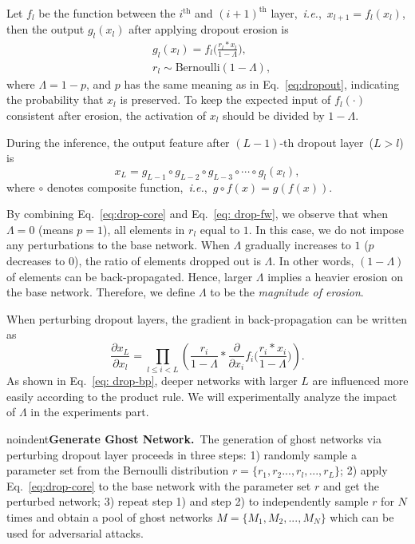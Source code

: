 \documentclass[letterpaper]{article} %
\def\ie{\emph{i.e.}}
\begin{document}
Let $f_l$ be the function between the $i^\text{th}$ and $(i+1)^\text{th}$ layer,~\ie,~$x_{l+1}=f_l(x_l)$, then the output $g_l(x_l)$ after applying dropout erosion is
\begin{equation} \label{eq:drop-core}
\begin{split}
& g_l(x_l) = f_l\Big(\frac{r_l*x_l}{1-\Lambda}\Big), \\
& r_l\sim\text{Bernoulli}(1-\Lambda),
\end{split}
\end{equation}
where $\Lambda=1-p$, and $p$ has the same meaning as in Eq.~\eqref{eq:dropout}, indicating the probability that $x_l$ is preserved. To keep the expected input of $f_l(\cdot)$ consistent after erosion, the activation of $x_l$ should be divided by $1-\Lambda$.

During the inference, the output feature after $(L-1)$-th dropout layer~($L>l$) is
\begin{equation} \label{eq: drop-fw}
x_{L} = g_{L-1}\circ g_{L-2}\circ g_{L-3}\circ\cdots\circ g_{l}(x_l),
\end{equation}
where $\circ$ denotes composite function,~\ie,~$g\circ f(x)=g\left(f(x)\right)$.

By combining Eq.~\eqref{eq:drop-core} and Eq.~\eqref{eq: drop-fw}, we observe that when $\Lambda=0$ (means $p = 1$), all elements in $r_l$ equal to $1$. In this case, we do not impose any perturbations to the base network. When $\Lambda$ gradually increases to $1$ ($p$ decreases to $0$), the ratio of elements dropped out is $\Lambda$. In other words, $(1-\Lambda)$ of elements can be back-propagated. Hence, larger $\Lambda$ implies a heavier erosion on the base network. Therefore, we define $\Lambda$ to be the \textit{magnitude of erosion}.

When perturbing dropout layers, the gradient in back-propagation can be written as
\begin{equation} \label{eq: drop-bp}
\frac{\partial x_{L}}{\partial x_l}=\prod_{l\leq i< L}\left(\frac{r_i}{1-\Lambda} * \frac{\partial }{\partial x_i}f_i\Big(\frac{r_i*x_i}{1-\Lambda}\Big)\right).
\end{equation}
As shown in Eq.~\eqref{eq: drop-bp}, deeper networks with larger $L$ are influenced more easily according to the product rule. We will experimentally analyze the impact of $\Lambda$ in the experiments part.

noindent\textbf{Generate Ghost Network.}~The generation of ghost networks via perturbing dropout layer proceeds in three steps: 1) randomly sample a parameter set from the Bernoulli distribution $r=\{r_1,r_2...,r_l,...,r_L\}$; 2) apply Eq.~\eqref{eq:drop-core} to the base network with the parameter set $r$ and get the perturbed network; 3) repeat step 1) and step 2) to independently sample $r$ for $N$ times and obtain a pool of ghost networks $M=\{M_1,M_2,...,M_N\}$ which can be used for adversarial attacks.%
\end{document}

